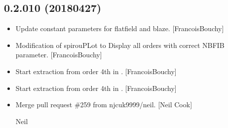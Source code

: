 \documentclass[a4paper,10pt,english]{report}
\begin{document}
\subsection{0.2.010 (2018\sphinxhyphen{}04\sphinxhyphen{}27)}
\label{\detokenize{misc/changelog:id470}}\begin{itemize}
\item {} 
Update constant parameters for flat\sphinxhyphen{}field and blaze. {[}FrancoisBouchy{]}

\item {} 
Modification of spirouPLot to Display all orders with correct NBFIB
parameter. {[}FrancoisBouchy{]}

\item {} 
Start extraction from order 4th in .
{[}FrancoisBouchy{]}

\item {} 
Start extraction from order 4th in . {[}FrancoisBouchy{]}

\item {} 
Merge pull request \#259 from njcuk9999/neil. {[}Neil Cook{]}

Neil

\end{itemize}
\end{document}

